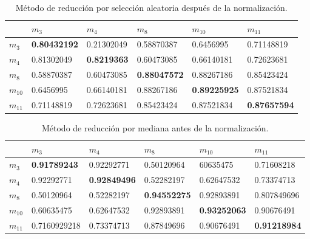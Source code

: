 \hfill

\begin{table}[ht!]
\begin{center}
\begin{tabular}{| p{2cm} | p{2cm} | p{2cm} | p{2cm} | p{2cm} | p{2cm} |}
\hline
 & $m_{3}$ & $m_{4}$ & $m_{8}$ & $m_{10}$ & $m_{11}$ \\
\hline
$m_{3}$ & \bf{0.80432192} & 0.21302049 & 0.58870387 & 0.6456995 & 0.71148819\\
\hline
$m_{4}$ & 0.81302049 & \bf{0.8219363} & 0.60473085 & 0.66140181 & 0.72623681\\
\hline
$m_{8}$ & 0.58870387 & 0.60473085 & \bf{0.88047572} & 0.88267186 & 0.85423424\\
\hline 
$m_{10}$ & 0.6456995 & 0.66140181 & 0.88267186 & \bf{0.89225925} & 0.87521834\\
\hline
$m_{11}$ & 0.71148819 & 0.72623681 & 0.85423424 & 0.87521834 & \bf{0.87657594}\\
\hline
\end{tabular}
\end{center} 	
\caption{Método de reducción por selección aleatoria después de la normalización.} \label{covrannorm1}
\end{table}

\hfill

\begin{table}[ht!]
\begin{center}
\begin{tabular}{| p{2cm} | p{2cm} | p{2cm} | p{2cm} | p{2cm} | p{2cm} |}
\hline
 & $m_{3}$ & $m_{4}$ & $m_{8}$ & $m_{10}$ & $m_{11}$ \\
\hline
$m_{3}$ & \bf{0.91789243} & 0.92292771 & 0.50120964 & 60635475 & 0.71608218\\
\hline
$m_{4}$ & 0.92292771 & \bf{0.92849496} & 0.52282197 & 0.62647532 & 0.73374713\\
\hline
$m_{8}$ & 0.50120964 & 0.52282197 & \bf{0.94552275} & 0.92893891 & 0.807849696\\
\hline 
$m_{10}$ & 0.60635475 & 0.62647532 & 0.92893891 & \bf{0.93252063} & 0.90676491\\
\hline
$m_{11}$ & 0.7160929218 & 0.73374713 & 0.87849696 & 0.90676491 & \bf{0.91218984}\\
\hline
\end{tabular}
\end{center} 	
\caption{Método de reducción por mediana antes de la normalización.} \label{covmed1}
\end{table}


